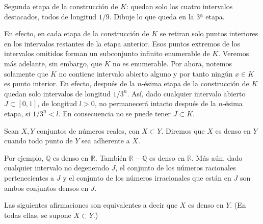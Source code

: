 \documentclass[12pt,oneside]{book}
\begin{document}
\begin{center}
\end{center}

Segunda etapa de la construcción de \(K\): quedan solo los cuatro intervalos destacados, todos de longitud \(1/9\). Dibuje lo que queda en la 3ª etapa.

En efecto, en cada etapa de la construcción de \(K\) se retiran solo puntos interiores en los intervalos restantes de la etapa anterior. Esos puntos extremos de los intervalos omitidos forman un subconjunto infinito enumerable de \(K\). Veremos más adelante, sin embargo, que \(K\) no es enumerable. Por ahora, notemos solamente que \(K\) no contiene intervalo abierto alguno y por tanto ningún \(x \in K\) es punto interior. En efecto, después de la \(n\)-ésima etapa de la construcción de \(K\) quedan solo intervalos de longitud \(1/3^n\). Así, dado cualquier intervalo abierto \(J \subset [0, 1]\), de longitud \(l > 0\), no permanecerá intacto después de la \(n\)-ésima etapa, si \(1/3^n < l\). En consecuencia no se puede tener \(J \subset K\).

Sean \(X, Y\) conjuntos de números reales, con \(X \subset Y\). Diremos que \(X\) es denso en \(Y\) cuando todo punto de \(Y\) sea adherente a \(X\).

Por ejemplo, \(\mathbb{Q}\) es denso en \(\mathbb{R}\). También \(\mathbb{R} - \mathbb{Q}\) es denso en \(\mathbb{R}\). Más aún, dado cualquier intervalo no degenerado \(J\), el conjunto de los números racionales pertenecientes a \(J\) y el conjunto de los números irracionales que están en \(J\) son ambos conjuntos densos en \(J\).

Las siguientes afirmaciones son equivalentes a decir que \(X\) es denso en \(Y\). (En todas ellas, se supone \(X \subset Y\).)
\end{document}
